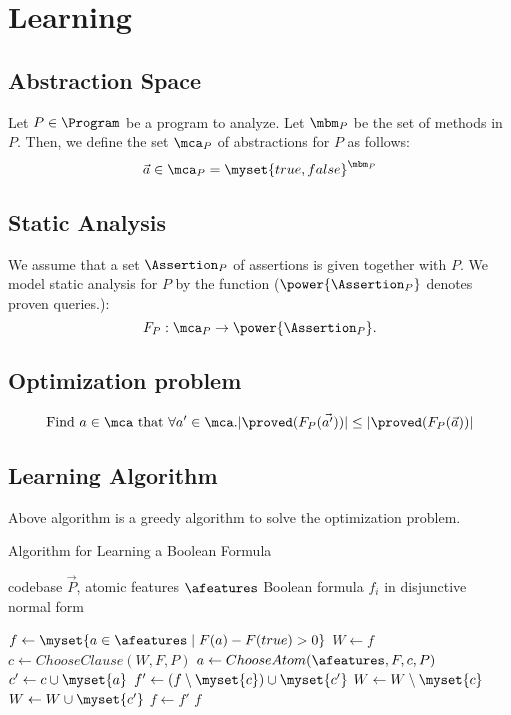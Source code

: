 \section{Learning}
\subsection{Abstraction Space} \label{sec:setting} 
Let $P \in \Program$ be a program to analyze. Let $\mbm_P$ be the set
of methods in $P$.  Then, we define the set $\mca_P$ of abstractions
for $P$ as follows:
\[
\vec{a} \in \mca_P = \myset{true,false}^{\mbm_P}
\]
\subsection{Static Analysis}
We assume that a set $\Assertion_P$ of assertions is given together
with $P$. We model static analysis for $P$ by the function
($\power{\Assertion_P}$ denotes proven queries.):
\[
F_P : \mca_P \to \power{\Assertion_P}.
\]


\subsection{Optimization problem}
\[
\mbox{Find $a \in \mca$ that }
\forall a' \in \mca. |\proved (F_{P}( \vec{a'}))| \le
|\proved(F_P (\vec{a}))| 
\]
\subsection{Learning Algorithm}
Above algorithm is a greedy algorithm to solve the optimization problem.
\begin{algorithm}[t]
	\caption{Algorithm for Learning a Boolean Formula}\label{alg:learning}
	\begin{algorithmic}[1]
		\Require %
		 codebase $\vec{P}$, atomic features $\afeatures$
		\Ensure Boolean formula $f_i$ in disjunctive normal form
		
		\State $f \gets \myset{a \in \afeatures \mid F(a) - F(true) > 0}$
		\State $W \gets f$
			\State $c \gets ChooseClause(W,F,P)$
			\State $a \gets ChooseAtom(\afeatures,F,c,P)$
			\State $c' \gets c \cup \myset{a}$ 
			\State $f' \gets (f\setminus \myset{c}) \cup 
			\myset{c'}$ 
			\State $W \gets W \setminus \myset{c}$
			\State $W \gets W \cup \myset{c'}$
			\State $f \gets f'$
			\EndIf
		\EndWhile
		\State \Return $f$
		\EndProcedure
	\end{algorithmic}
\end{algorithm}

